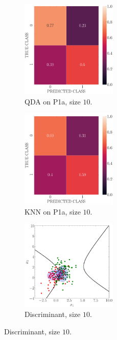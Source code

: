 \documentclass[11pt, a4 paper]{article}
\begin{document}
\begin{figure}[!htbp]
\centering
\quad
    \begin{subfigure}[!htbp]{0.24\textwidth}
       \centering
       \includegraphics[width=1.8in]{../results/ex1/conf_mtx_QD_ML_dataset_P1a_size_10.pdf}
       \caption{QDA on P1a, size $10$.}
       \label{fig:QDA_P1a_10}
    \end{subfigure}
\quad
    \begin{subfigure}[!htbp]{0.24\textwidth}
       \centering
       \includegraphics[width=1.8in]{../results/ex1/conf_mtx_KNN_dataset_P1a_size_10.pdf}
       \caption{KNN on P1a, size $10$.}
       \label{fig:KNN_P1a_10}
    \end{subfigure}
\quad
    \begin{subfigure}[!htbp]{0.24\textwidth}
       \centering
       \includegraphics[width=1.8in]{../results/ex1/samples_QD_ML_dataset_P1a_size_10.pdf}
       \caption{Discriminant, size $10$.}
       \label{fig:DF_P1a_10}
    \end{subfigure}
    

\end{figure}
\end{document}
